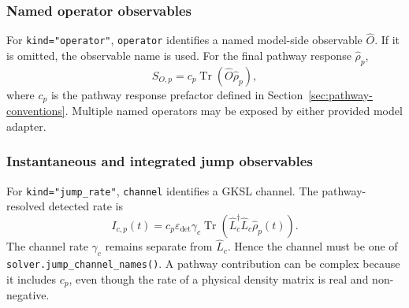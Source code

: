 \documentclass[11pt]{article}
\begin{document}
\subsubsection{Named operator observables}

For \texttt{kind="operator"}, \texttt{operator} identifies a named model-side observable $\hat{O}$. If it is omitted, the observable name is used. For the final pathway response $\hat{\rho}_p$,
\begin{equation}
    S_{O,p}=c_p\operatorname{Tr}(\hat{O}\hat{\rho}_p),
\end{equation}
where $c_p$ is the pathway response prefactor defined in Section~\ref{sec:pathway-conventions}. Multiple named operators may be exposed by either provided model adapter.

\subsubsection{Instantaneous and integrated jump observables}

For \texttt{kind="jump\_rate"}, \texttt{channel} identifies a GKSL channel. The pathway-resolved detected rate is
\begin{equation}
    I_{c,p}(t)=c_p\varepsilon_{\mathrm{det}}\gamma_c
    \operatorname{Tr}\!\left(\hat{L}_c^\dagger \hat{L}_c\hat{\rho}_p(t)\right).
\end{equation}
The channel rate $\gamma_c$ remains separate from $\hat{L}_c$. Hence the channel must be one of \texttt{solver.jump\_channel\_names()}. A pathway contribution can be complex because it includes $c_p$, even though the rate of a physical density matrix is real and non-negative.
\end{document}
